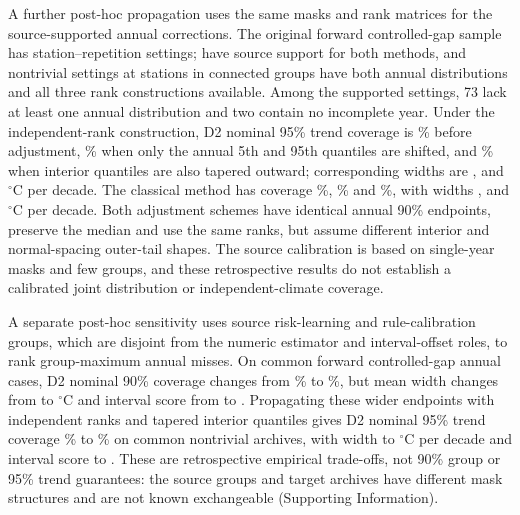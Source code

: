 \documentclass[draft,linenumbers]{agujournal2025}
\begin{document}
A further post-hoc propagation uses the same masks and rank matrices for the source-supported annual corrections. The original forward controlled-gap sample has \SYTrendAll{} station--repetition settings; \SYTrendSupported{} have source support for both methods, and \SYTrendCommon{} nontrivial settings at \SYTrendStations{} stations in \SYTrendGroups{} connected groups have both annual distributions and all three rank constructions available. Among the supported settings, 73 lack at least one annual distribution and two contain no incomplete year. Under the independent-rank construction, D2 nominal 95\% trend coverage is \SYTrendDTwoBase\% before adjustment, \SYTrendDTwoEnd\% when only the annual 5th and 95th quantiles are shifted, and \SYTrendDTwoTaper\% when interior quantiles are also tapered outward; corresponding widths are \SYTrendDTwoWidthBase{}, \SYTrendDTwoWidthEnd{} and \SYTrendDTwoWidthTaper{}$^{\circ}$C per decade. The classical method has coverage \SYTrendClassicBase\%, \SYTrendClassicEnd\% and \SYTrendClassicTaper\%, with widths \SYTrendClassicWidthBase{}, \SYTrendClassicWidthEnd{} and \SYTrendClassicWidthTaper{}$^{\circ}$C per decade. Both adjustment schemes have identical annual 90\% endpoints, preserve the median and use the same ranks, but assume different interior and normal-spacing outer-tail shapes. The source calibration is based on single-year masks and few groups, and these retrospective results do not establish a calibrated joint distribution or independent-climate coverage.

A separate post-hoc sensitivity uses source risk-learning and rule-calibration groups, which are disjoint from the numeric estimator and interval-offset roles, to rank group-maximum annual misses. On \GMAnnualCases{} common forward controlled-gap annual cases, D2 nominal 90\% coverage changes from \GMAnnualDBase\% to \GMAnnualDNew\%, but mean width changes from \GMAnnualDWidthBase{} to \GMAnnualDWidthNew{}$^{\circ}$C and interval score from \GMAnnualDScoreBase{} to \GMAnnualDScoreNew{}. Propagating these wider endpoints with independent ranks and tapered interior quantiles gives D2 nominal 95\% trend coverage \GMTrendDBaseCov\% to \GMTrendDNewCov\% on \GMTrendCases{} common nontrivial archives, with width \GMTrendDBaseWidth{} to \GMTrendDTaperWidth{}$^{\circ}$C per decade and interval score \GMTrendDBaseScore{} to \GMTrendDNewScore{}. These are retrospective empirical trade-offs, not 90\% group or 95\% trend guarantees: the source groups and target archives have different mask structures and are not known exchangeable (Supporting Information).
\end{document}
